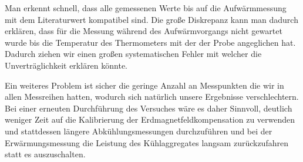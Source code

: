 Man erkennt schnell, dass alle gemessenen Werte bis auf die Aufwärmmessung mit dem Literaturwert kompatibel sind. Die große Diskrepanz kann man dadurch erklären, dass für die Messung während des Aufwärmvorgangs nicht gewartet wurde bis die Temperatur des Thermometers mit der der Probe angeglichen hat. Dadurch ziehen wir einen großen systematischen Fehler mit welcher die Unverträglichkeit erklären könnte. \par 
Ein weiteres Problem ist sicher die geringe Anzahl an Messpunkten die wir in allen Messreihen hatten, wodurch sich natürlich unsere Ergebnisse verschlechtern. Bei einer erneuten Durchführung des Versuches wäre es daher Sinnvoll, deutlich weniger Zeit auf die Kalibrierung der Erdmagnetfeldkompensation zu verwenden und stattdessen längere Abkühlungsmessungen durchzuführen und bei der Erwärmungsmessung die Leistung des Kühlaggregates langsam zurückzufahren statt es auszuschalten.